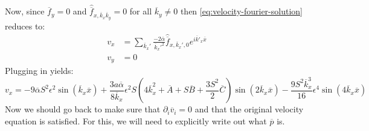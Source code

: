 \documentclass[reqno]{article}
\begin{document}
	Now, since $\overline{f}_y = 0$ and $\hat{\overline{f}}_{x, \overline{k}_x \overline{k}_y} = 0$ for all $\overline{k}_y \neq 0$ then \eqref{eq:velocity-fourier-solution} reduces to:
	\begin{equation}
	\begin{split}
		v_x 
		&= \sum_{\overline{k}_x'}
		\frac{-2\overline{\alpha}}{\overline{k}_x'^2}
		\hat{\overline{f}}_{x, \overline{k}_x', 0}
		e^{i \overline{k}'_x \overline{x}} \\
		v_y
		&= 0
	\end{split}
	\end{equation}
	Plugging in yields:
	\begin{equation}
		v_x
		= -9 \overline{\alpha} S^2 \epsilon^2 \sin \left( \overline{k}_x \overline{x} \right)
		+ \frac{3 a \overline{\alpha}}{8 \overline{k}_x} \epsilon^2 S 
		\left(
		4 \overline{k}_x^2
		+ \overline{A}
		+ S \overline{B}
		+ \frac{3 S^2}{2} \overline{C}
		\right)
		\sin \left( 2 \overline{k}_x \overline{x} \right)
		- \frac{9 S^2 \overline{k}_x^3}{16} \epsilon^4
		\sin \left( 4 \overline{k}_x \overline{x} \right)
	\end{equation}
	Now we should go back to make sure that $\partial_i \overline{v}_i = 0$ and that the original velocity equation is satisfied. For this, we will need to explicitly write out what $\overline{p}$ is. 
	
	
\end{document}
